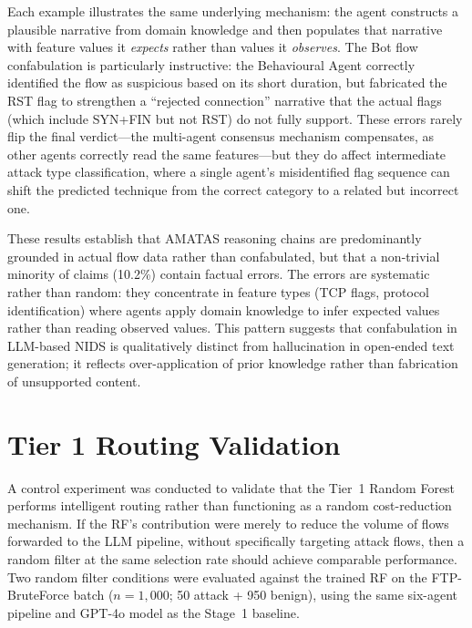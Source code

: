 \documentclass[../main.tex]{subfiles}
\begin{document}
Each example illustrates the same underlying mechanism: the agent constructs a plausible narrative from domain knowledge and then populates that narrative with feature values it \textit{expects} rather than values it \textit{observes}. The Bot flow confabulation is particularly instructive: the Behavioural Agent correctly identified the flow as suspicious based on its short duration, but fabricated the RST flag to strengthen a ``rejected connection'' narrative that the actual flags (which include SYN+FIN but not RST) do not fully support. These errors rarely flip the final verdict---the multi-agent consensus mechanism compensates, as other agents correctly read the same features---but they do affect intermediate attack type classification, where a single agent's misidentified flag sequence can shift the predicted technique from the correct category to a related but incorrect one.

These results establish that AMATAS reasoning chains are predominantly grounded in actual flow data rather than confabulated, but that a non-trivial minority of claims (10.2\%) contain factual errors. The errors are systematic rather than random: they concentrate in feature types (TCP flags, protocol identification) where agents apply domain knowledge to infer expected values rather than reading observed values. This pattern suggests that confabulation in LLM-based NIDS is qualitatively distinct from hallucination in open-ended text generation; it reflects over-application of prior knowledge rather than fabrication of unsupported content.

\section{Tier 1 Routing Validation}
\label{sec:routing-validation}

A control experiment was conducted to validate that the Tier~1 Random Forest performs intelligent routing rather than functioning as a random cost-reduction mechanism. If the RF's contribution were merely to reduce the volume of flows forwarded to the LLM pipeline, without specifically targeting attack flows, then a random filter at the same selection rate should achieve comparable performance. Two random filter conditions were evaluated against the trained RF on the FTP-BruteForce batch ($n = 1{,}000$; 50 attack + 950 benign), using the same six-agent pipeline and GPT-4o model as the Stage~1 baseline.
\end{document}
